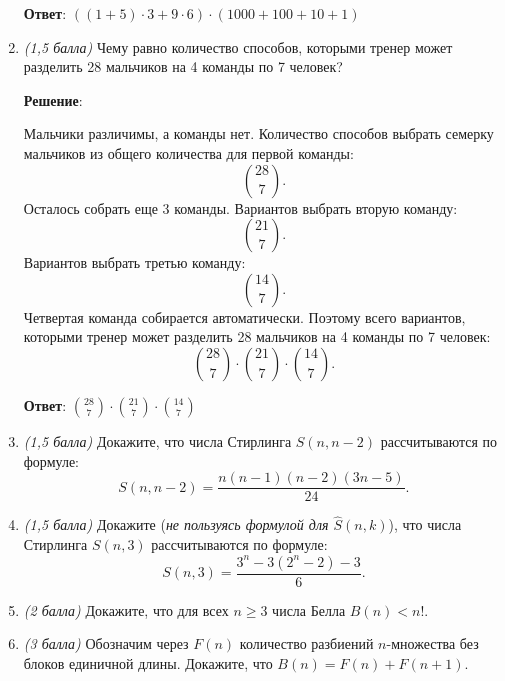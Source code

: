 \documentclass{article}
\begin{document}
\begin{enumerate}
    \textbf{Ответ}:
    $((1 + 5) \cdot 3 + 9 \cdot 6) \cdot (1000 + 100 + 10 + 1)$

    
    \item \textit{(1,5 балла)} Чему равно количество способов, которыми тренер может разделить 28 мальчиков на 4 команды по 7 человек?
    
    \textbf{Решение}:

    Мальчики различимы, а команды нет. Количество способов выбрать семерку мальчиков из общего количества для первой команды:
    \begin{equation}
        \binom{28}{7}.
    \end{equation}
    Осталось собрать еще 3 команды. Вариантов выбрать вторую команду:
    \begin{equation}
        \binom{21}{7}.
    \end{equation}
    Вариантов выбрать третью команду:
    \begin{equation}
        \binom{14}{7}.
    \end{equation}
    Четвертая команда собирается автоматически. Поэтому всего вариантов, которыми тренер может разделить 28 мальчиков на 4 команды по 7 человек:
    \begin{equation}
        \binom{28}{7} \cdot \binom{21}{7} \cdot \binom{14}{7}.
    \end{equation}

    \textbf{Ответ}:
    $\binom{28}{7} \cdot \binom{21}{7} \cdot \binom{14}{7}$


    
    \item \textit{(1,5 балла)} Докажите, что числа Стирлинга $S(n,n-2)$ рассчитываются по формуле:
    $$S(n,n-2)=\frac{n(n-1)(n-2)(3n-5)}{24}.$$
    
    \item \textit{(1,5 балла)} Докажите (\textit{не пользуясь формулой для $\hat{S}(n,k)$}), что числа Стирлинга $S(n,3)$ рассчитываются по формуле:
    $$S(n,3)=\frac{3^n-3(2^n-2)-3}{6}.$$
    
    \item \textit{(2 балла)} Докажите, что для всех $n\geq3$ числа Белла $B(n)<n!$.
    
    \item \textit{(3 балла)} Обозначим через $F(n)$ количество разбиений $n$-множества без блоков единичной длины. Докажите, что $B(n) = F(n) + F(n+1)$.
    
    \end{enumerate}
\end{document}
